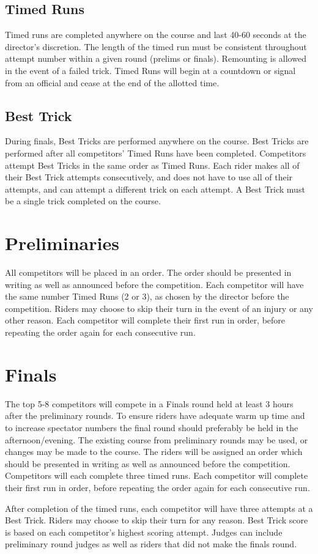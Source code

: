 \subsection{Timed Runs}
Timed runs are completed anywhere on the course and last 40-60 seconds at the director's discretion.
The length of the timed run must be consistent throughout attempt number within a given round (prelims or finals).
Remounting is allowed in the event of a failed trick.
Timed Runs will begin at a countdown or signal from an official and cease at the end of the allotted time.

\subsection{Best Trick}
During finals, Best Tricks are performed anywhere on the course.
Best Tricks are performed after all competitors' Timed Runs have been completed.
Competitors attempt Best Tricks in the same order as Timed Runs.
Each rider makes all of their Best Trick attempts consecutively, and does not have to use all of their attempts, and can attempt a different trick on each attempt.
A Best Trick must be a single trick completed on the course.

\section{Preliminaries}
All competitors will be placed in an order.
The order should be presented in writing as well as announced before the competition.
Each competitor will have the same number Timed Runs (2 or 3), as chosen by the director before the competition.
Riders may choose to skip their turn in the event of an injury or any other reason.
Each competitor will complete their first run in order, before repeating the order again for each consecutive run.

\section{Finals}
The top 5-8 competitors will compete in a Finals round held at least 3 hours after the preliminary rounds.
To ensure riders have adequate warm up time and to increase spectator numbers the final round should preferably be held in the afternoon/evening.
The existing course from preliminary rounds may be used, or changes may be made to the course.
The riders will be assigned an order which should be presented in writing as well as announced before the competition.
Competitors will each complete three timed runs.
Each competitor will complete their first run in order, before repeating the order again for each consecutive run.

After completion of the timed runs, each competitor will have three attempts at a Best Trick.
Riders may choose to skip their turn for any reason.
Best Trick score is based on each competitor's highest scoring attempt.
Judges can include preliminary round judges as well as riders that did not make the finals round.
